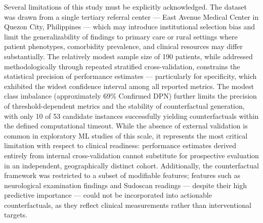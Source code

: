 \documentclass[pdflatex,sn-vancouver-num]{sn-jnl}
\begin{document}
Several limitations of this study must be explicitly acknowledged. The dataset was drawn from a single tertiary referral center — East Avenue Medical Center in Quezon City, Philippines — which may introduce institutional selection bias and limit the generalizability of findings to primary care or rural settings where patient phenotypes, comorbidity prevalence, and clinical resources may differ substantially. The relatively modest sample size of 190 patients, while addressed methodologically through repeated stratified cross-validation, constrains the statistical precision of performance estimates — particularly for specificity, which exhibited the widest confidence interval among all reported metrics. The modest class imbalance (approximately 69\% Confirmed DPN) further limits the precision of threshold-dependent metrics and the stability of counterfactual generation, with only 10 of 53 candidate instances successfully yielding counterfactuals within the defined computational timeout. While the absence of external validation is common in exploratory ML studies of this scale, it represents the most critical limitation with respect to clinical readiness: performance estimates derived entirely from internal cross-validation cannot substitute for prospective evaluation in an independent, geographically distinct cohort. Additionally, the counterfactual framework was restricted to a subset of modifiable features; features such as neurological examination findings and Sudoscan readings — despite their high predictive importance — could not be incorporated into actionable counterfactuals, as they reflect clinical measurements rather than interventional targets.
\end{document}
